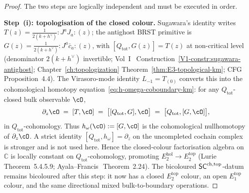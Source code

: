 \begin{proof}
The two steps are logically independent and must be executed in
order.

\medskip\noindent\textbf{Step~(i): topologisation of the closed
colour.}
Sugawara's identity writes
$T(z)=\tfrac{1}{2(k+h^{\vee})}{:}J^aJ_a{:}(z)$; the antighost
BRST primitive is
$G(z)=\tfrac{1}{2(k+h^{\vee})}{:}J^a\bar c_a{:}(z)$, with
$[Q_{\mathrm{tot}},G(z)]=T(z)$ at non-critical level (denominator
$2(k+h^\vee)$ invertible; Vol~I~%
Construction~\ref*{V1-constr:sugawara-antighost};
Chapter~\ref{ch:topologization}
Theorem~\ref{thm:E3-topological-km};
CFG~\cite{CFG2602}\,Proposition~4.4). The Virasoro-mode identity
$L_{-1}=T_{(0)}$ converts this into the cohomological homotopy
equation~\eqref{eq:h-omega-coboundary-km}: for any
$Q_{\mathrm{tot}}$-closed bulk observable $\cO$,
\[
\partial_z\cO
 \;=\;[T,\cO]
 \;=\;\bigl[[Q_{\mathrm{tot}},G],\cO\bigr]
 \;=\;\bigl[Q_{\mathrm{tot}},[G,\cO]\bigr],
\]
in \(Q_{\mathrm{tot}}\)-cohomology. Thus
\(h_\omega(\cO):=[G,\cO]\) is the cohomological nullhomotopy of
\(\partial_z\cO\). A strict identity
\([Q_{\mathrm{tot}},h_\omega]=\partial_z\) on the uncompleted
cochain complex is stronger and is not used here. Hence the
closed-colour factorisation algebra on
$\mathbb{C}$ is locally constant on $Q_{\mathrm{tot}}$-cohomology,
promoting $E_2^{\mathrm{hol}}\to E_2^{\mathrm{top}}$
(Lurie~\cite{HA}\,Theorem~5.4.5.9;
Ayala--Francis~\cite{AF15}\,Theorem~2.24). The bicoloured
$\mathsf{SC}^{\mathrm{ch},\mathrm{top}}$-datum remains bicoloured after this step: it now has a
closed $E_2^{\mathrm{top}}$ colour, an open $E_1^{\mathrm{top}}$
colour, and the same directional mixed bulk-to-boundary operations.


\end{proof}
